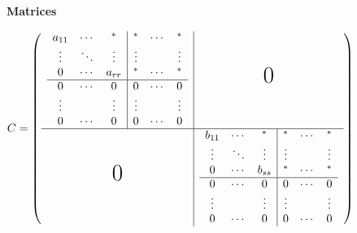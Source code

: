 \documentclass[10pt,fleqn]{article}
\def\distance{\baselineskip}
\newenvironment{heading}{\begin{center}\bfseries}{\end{center}}
\begin{document}
    \begin{minipage}{\linewidth}
        \centering
        \vspace{\distance}
        \begin{heading}
            Matrices
        \end{heading}

        \(
            C = \left(\begin{array}{c|c}
                \begin{array}{ccc|ccc}
                    a_{11} & \cdots & ^* & ^* & \cdots & ^*\\
                    \vdots & \ddots & \vdots & \vdots & & \vdots\\
                    0 & \cdots & a_{rr} & ^* & \cdots & ^*\\
                    \hline
                    0 & \cdots & 0 & 0 & \cdots & 0\\
                    \vdots & & \vdots & \vdots & & \vdots\\
                    0 & \cdots & 0 & 0 & \cdots & 0
                \end{array} & \text{\huge 0}\\
                \hline
                \text{\huge 0} & \begin{array}{ccc|ccc}
                    b_{11} & \cdots & ^* & ^* & \cdots & ^*\\
                    \vdots & \ddots & \vdots & \vdots & & \vdots\\
                    0 & \cdots & b_{ss} & ^* & \cdots & ^*\\
                    \hline
                    0 & \cdots & 0 & 0 & \cdots & 0\\
                    \vdots & & \vdots & \vdots & & \vdots\\
                    0 & \cdots & 0 & 0 & \cdots & 0
                \end{array}
            \end{array}\right)
        \)

        \vspace{0.5cm}


\end{minipage}
\end{document}
